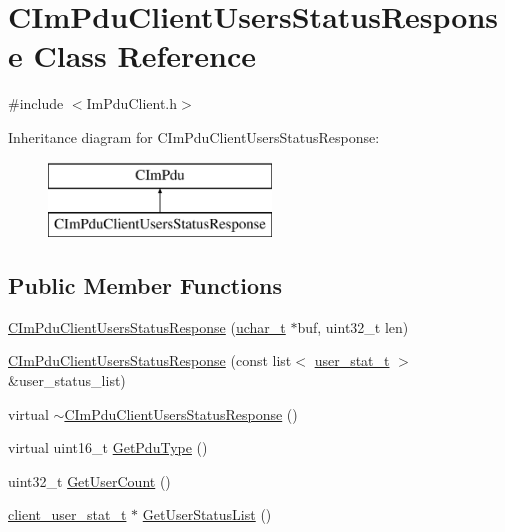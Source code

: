 \hypertarget{class_c_im_pdu_client_users_status_response}{}\section{C\+Im\+Pdu\+Client\+Users\+Status\+Response Class Reference}
\label{class_c_im_pdu_client_users_status_response}


{\ttfamily \#include $<$Im\+Pdu\+Client.\+h$>$}

Inheritance diagram for C\+Im\+Pdu\+Client\+Users\+Status\+Response\+:\begin{figure}[H]
\begin{center}
\leavevmode
\includegraphics[height=2.000000cm]{class_c_im_pdu_client_users_status_response}
\end{center}
\end{figure}
\subsection*{Public Member Functions}
\begin{DoxyCompactItemize}
\item 
\hyperlink{class_c_im_pdu_client_users_status_response_a27203d205e0269c5a106ce81e54f553c}{C\+Im\+Pdu\+Client\+Users\+Status\+Response} (\hyperlink{base_2ostype_8h_a124ea0f8f4a23a0a286b5582137f0b8d}{uchar\+\_\+t} $\ast$buf, uint32\+\_\+t len)
\item 
\hyperlink{class_c_im_pdu_client_users_status_response_a6cb60b2394cd4111dc0cf46b00673873}{C\+Im\+Pdu\+Client\+Users\+Status\+Response} (const list$<$ \hyperlink{structuser__stat__t}{user\+\_\+stat\+\_\+t} $>$ \&user\+\_\+status\+\_\+list)
\item 
virtual \hyperlink{class_c_im_pdu_client_users_status_response_a9948ec29a28c6f3a0a8ef13edcaa898e}{$\sim$\+C\+Im\+Pdu\+Client\+Users\+Status\+Response} ()
\item 
virtual uint16\+\_\+t \hyperlink{class_c_im_pdu_client_users_status_response_aff1f09e7a03a163953dd186c8ba4c606}{Get\+Pdu\+Type} ()
\item 
uint32\+\_\+t \hyperlink{class_c_im_pdu_client_users_status_response_ad4523bb25faeca083ce1809085f508d2}{Get\+User\+Count} ()
\item 
\hyperlink{structclient__user__stat__t}{client\+\_\+user\+\_\+stat\+\_\+t} $\ast$ \hyperlink{class_c_im_pdu_client_users_status_response_ad4e9ce66d8048a17040958363217ef41}{Get\+User\+Status\+List} ()
\end{DoxyCompactItemize}
